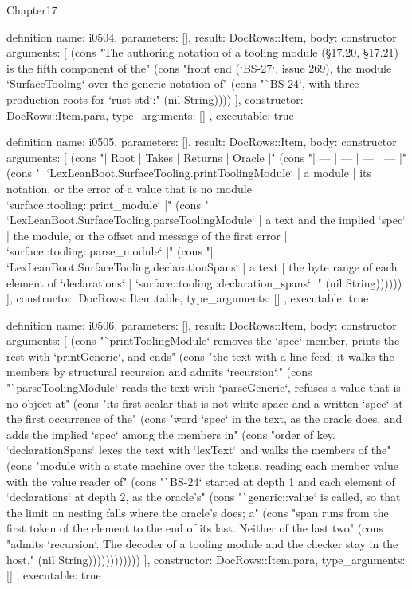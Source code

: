 \begin{lexlean}{Chapter17}
\begin{semanticmodule}
definition{
  name: i0504,
  parameters: [],
  result: DocRows::Item,
  body: constructor{
    arguments: [
      (cons "The authoring notation of a tooling module (§17.20, §17.21) is the fifth component of the" (cons "front end (`BS-27`, issue 269), the module `SurfaceTooling` over the generic notation of" (cons "`BS-24`, with three production roots for `rust-std`:" (nil String))))
    ],
    constructor: DocRows::Item.para,
    type_arguments: []
  },
  executable: true
}

definition{
  name: i0505,
  parameters: [],
  result: DocRows::Item,
  body: constructor{
    arguments: [
      (cons "| Root | Takes | Returns | Oracle |" (cons "| --- | --- | --- | --- |" (cons "| `LexLeanBoot.SurfaceTooling.printToolingModule` | a module | its notation, or the error of a value that is no module | `surface::tooling::print_module` |" (cons "| `LexLeanBoot.SurfaceTooling.parseToolingModule` | a text and the implied `spec` | the module, or the offset and message of the first error | `surface::tooling::parse_module` |" (cons "| `LexLeanBoot.SurfaceTooling.declarationSpans` | a text | the byte range of each element of `declarations` | `surface::tooling::declaration_spans` |" (nil String))))))
    ],
    constructor: DocRows::Item.table,
    type_arguments: []
  },
  executable: true
}

definition{
  name: i0506,
  parameters: [],
  result: DocRows::Item,
  body: constructor{
    arguments: [
      (cons "`printToolingModule` removes the `spec` member, prints the rest with `printGeneric`, and ends" (cons "the text with a line feed; it walks the members by structural recursion and admits `recursion`." (cons "`parseToolingModule` reads the text with `parseGeneric`, refuses a value that is no object at" (cons "its first scalar that is not white space and a written `spec` at the first occurrence of the" (cons "word `spec` in the text, as the oracle does, and adds the implied `spec` among the members in" (cons "order of key. `declarationSpans` lexes the text with `lexText` and walks the members of the" (cons "module with a state machine over the tokens, reading each member value with the value reader of" (cons "`BS-24` started at depth 1 and each element of `declarations` at depth 2, as the oracle's" (cons "`generic::value` is called, so that the limit on nesting falls where the oracle's does; a" (cons "span runs from the first token of the element to the end of its last. Neither of the last two" (cons "admits `recursion`. The decoder of a tooling module and the checker stay in the host." (nil String))))))))))))
    ],
    constructor: DocRows::Item.para,
    type_arguments: []
  },
  executable: true
}
\end{semanticmodule}
\end{lexlean}
